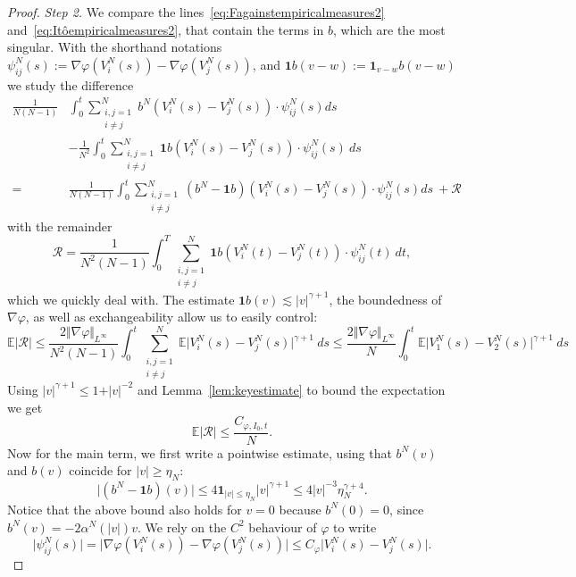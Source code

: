 \documentclass[10pt,a4paper]{amsart}
\begin{document}
\begin{proof}
    \textit{Step 2.} We compare the lines~\eqref{eq:Fagainstempiricalmeasures2} and~\eqref{eq:Itôempiricalmeasures2}, that contain the terms in $b$, which are the most singular. With the shorthand notations $\psi^N_{ij}(s):=\nabla\varphi(V^N_i(s))-\nabla\varphi(V^N_j(s))$, and $\mathbf{1}b(v-w):=\mathbf{1}_{v-w}b(v-w)$ we study the difference
    \begin{align*}
        \frac{1}{N(N-1)}&\int_0^t \sum_{\substack{i,j=1\\ i\neq j}}^N  b^N\left(V^N_i(s) -V^N_j(s)\right) \cdot \psi^N_{ij}(s) ds\\
        &-\frac{1}{N^2}\int_0^t \sum_{\substack{i,j=1\\ i\neq j}}^N \mathbf{1}b(V^N_i(s)-V^N_j(s)) \cdot \psi^N_{ij}(s)\ ds\\=
        &\frac{1}{N(N-1)} \int_0^t \sum_{\substack{i,j=1\\ i\neq j}}^N  (b^N-\mathbf{1}b)\left(V^N_i(s) -V^N_j(s)\right) \cdot \psi^N_{ij}(s) ds \ + \mathcal{R}
    \end{align*}
    with the remainder
    $$\mathcal{R}= \frac{1}{N^2(N-1)} \int_0^T \sum_{\substack{i,j=1\\ i\neq j}}^N \mathbf{1}b(V^N_i(t)-V^N_j(t)) \cdot \psi^N_{ij}(t)\ dt, $$
    which we quickly deal with.
    The estimate $\mathbf{1}b(v)\lesssim \vert v \vert^{\gamma+1}$, the boundedness of $\nabla\varphi$, as well as exchangeability allow us to easily control:
    $$\mathbb{E}\vert \mathcal{R} \vert \leq   \frac{2\Vert \nabla\varphi\Vert_{L^\infty}}{N^2(N-1)} \int_0^t \sum_{\substack{i,j=1\\ i\neq j}}^N \mathbb{E}\vert V^N_i(s)-V^N_j(s) \vert^{\gamma+1}\ ds \leq \frac{2\Vert \nabla\varphi\Vert_{L^\infty}}{N} \int_0^t \mathbb{E}\vert V^N_1(s)-V^N_2(s) \vert^{\gamma+1}\ ds$$
    Using $\vert v \vert^{\gamma+1} \leq 1 + \vert v \vert^{-2}$ and Lemma~\ref{lem:keyestimate} to bound the expectation we get
    $$\mathbb{E}\vert \mathcal{R} \vert \leq \frac{C_{\varphi,I_0,t}}{N}.$$
    Now for the main term, we first write a pointwise estimate, using that $b^N(v)$ and $b(v)$ coincide for $\vert v\vert\geq \eta_N$:
    $$\vert (b^N - \mathbf{1}b)(v)\vert \leq 4 \mathbf{1}_{\vert v \vert \leq \eta_N}\vert v \vert^{\gamma + 1}  \leq 4 \vert v \vert^{-3} \eta_N^{\gamma+4}.$$
    Notice that the above bound also holds for $v=0$ because $b^N(0)=0$, since $b^N(v)=-2\alpha^N(\vert v\vert)v$.
    We rely on the $C^2$ behaviour of $\varphi$ to write
    $$\vert \psi^N_{ij}(s)\vert=\vert\nabla\varphi(V^N_i(s))-\nabla\varphi(V^N_j(s))\vert \leq C_\varphi\vert V^N_i(s)-V^N_j(s)\vert.  $$

\end{proof}
\end{document}

